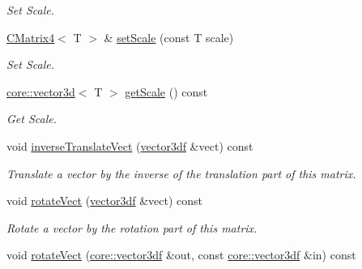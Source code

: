\begin{DoxyCompactItemize}
\begin{DoxyCompactList}\small\item\em Set Scale. \end{DoxyCompactList}\item 
\hyperlink{classirr_1_1core_1_1CMatrix4}{C\+Matrix4}$<$ T $>$ \& \hyperlink{classirr_1_1core_1_1CMatrix4_a18af980e2bc3575f60576b6d4b4cc0f3}{set\+Scale} (const T scale)\hypertarget{classirr_1_1core_1_1CMatrix4_a18af980e2bc3575f60576b6d4b4cc0f3}{}\label{classirr_1_1core_1_1CMatrix4_a18af980e2bc3575f60576b6d4b4cc0f3}

\begin{DoxyCompactList}\small\item\em Set Scale. \end{DoxyCompactList}\item 
\hyperlink{classirr_1_1core_1_1vector3d}{core\+::vector3d}$<$ T $>$ \hyperlink{classirr_1_1core_1_1CMatrix4_aa29f46680cea92b6d38886d1e9759cdd}{get\+Scale} () const 
\begin{DoxyCompactList}\small\item\em Get Scale. \end{DoxyCompactList}\item 
void \hyperlink{classirr_1_1core_1_1CMatrix4_a83bf069639e0538f047041ae51042907}{inverse\+Translate\+Vect} (\hyperlink{namespaceirr_1_1core_a06f169d08b5c429f5575acb7edbad811}{vector3df} \&vect) const \hypertarget{classirr_1_1core_1_1CMatrix4_a83bf069639e0538f047041ae51042907}{}\label{classirr_1_1core_1_1CMatrix4_a83bf069639e0538f047041ae51042907}

\begin{DoxyCompactList}\small\item\em Translate a vector by the inverse of the translation part of this matrix. \end{DoxyCompactList}\item 
void \hyperlink{classirr_1_1core_1_1CMatrix4_a8abcfbf972b19946c3022db380c6d153}{rotate\+Vect} (\hyperlink{namespaceirr_1_1core_a06f169d08b5c429f5575acb7edbad811}{vector3df} \&vect) const \hypertarget{classirr_1_1core_1_1CMatrix4_a8abcfbf972b19946c3022db380c6d153}{}\label{classirr_1_1core_1_1CMatrix4_a8abcfbf972b19946c3022db380c6d153}

\begin{DoxyCompactList}\small\item\em Rotate a vector by the rotation part of this matrix. \end{DoxyCompactList}\item 
void \hyperlink{classirr_1_1core_1_1CMatrix4_a592d57581118b651a24dc68b17b99ff6}{rotate\+Vect} (\hyperlink{namespaceirr_1_1core_a06f169d08b5c429f5575acb7edbad811}{core\+::vector3df} \&out, const \hyperlink{namespaceirr_1_1core_a06f169d08b5c429f5575acb7edbad811}{core\+::vector3df} \&in) const \hypertarget{classirr_1_1core_1_1CMatrix4_a592d57581118b651a24dc68b17b99ff6}{}\label{classirr_1_1core_1_1CMatrix4_a592d57581118b651a24dc68b17b99ff6}


\end{DoxyCompactItemize}
